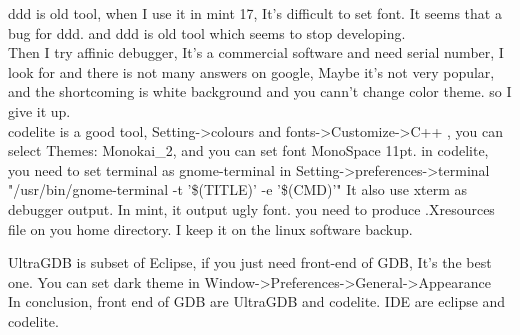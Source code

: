 \documentclass[a4paper,12pt,twoside]{book}
\begin{document}
ddd is old tool, when I use it in mint 17, It's difficult to set font.  It seems that a bug for ddd. and ddd is old tool which seems to stop developing.  \\

Then I try affinic debugger, It's a commercial software and need serial number, I look for and there is not many answers on google, Maybe it's not very popular,  and the shortcoming is white background and you cann't change color theme. so I give it up. \\

codelite is a good tool, Setting->colours and fonts->Customize->C++ , you can select Themes: Monokai\_2, and you can set font MonoSpace 11pt.  
in codelite, you need to set terminal as gnome-terminal in Setting->preferences->terminal "/usr/bin/gnome-terminal -t '\$(TITLE)' -e '\$(CMD)'"
It also use xterm as debugger output. In mint, it output ugly font.  you need to produce .Xresources file on you home directory.  I keep it on the linux software backup. 

UltraGDB is subset of Eclipse, if you just need front-end of GDB, It's the best one. You can set dark theme in Window->Preferences->General->Appearance \\

In conclusion,  front end of GDB are UltraGDB and codelite. IDE are eclipse and codelite.
\end{document}
